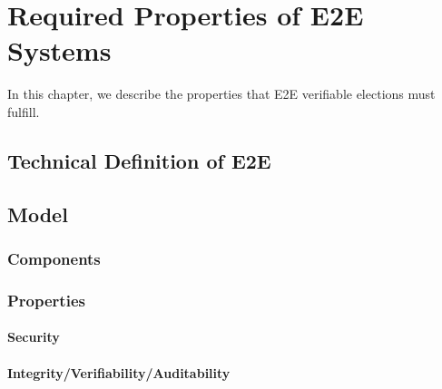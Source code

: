 \def\EA{\mathsf{EA}}
\def\VT{\mathsf{V}}
\def\RB{\mathsf{RB}}
\def\VC{\mathsf{VC}}
\def\AU{\mathsf{AU}}

\def\Exec{\mathsf{Exec}}


\def\Create{\mathtt{Create}}
\def\Sample{\mathtt{Sample}}
\def\FakeBallot{\mathtt{FakeBallot}}
\def\Deliver{\mathtt{Deliver}}
\def\Corrupt{\mathtt{Corrupt}}
\def\Verify{\mathtt{Verify}}
\def\Tally{\mathtt{Tally}}
\def\Vote{\mathtt{Vote}}
\def\RecordVote{\mathtt{RecordVote}}
\def\Append{\mathtt{Append}}
\def\Read{\mathtt{Read}}
\def\Send{\mathtt{Send}}
\def\Mail{\mathtt{Mail}}
\def\Audit{\mathtt{Audit}}
\def\VBB{\mathtt{VBB}}
\def\SendInit{\mathtt{SendInit}}
\def\GetRnd{\mathtt{GetRnd}}
\def\Select{\mathtt{Select}}
\def\RecordTally{\mathtt{RecordTally}}
\def\ReadTally{\mathtt{ReadTally}}
\def\Receipt{\mathtt{Receipt}}
\def\Result{\mathtt{Result}}
\def\ElectionFail{\mathtt{ElectionFail}}

\chapter{Required Properties of E2E Systems}

In this chapter, we describe the properties that E2E verifiable
elections must fulfill. 

\section{Technical Definition of E2E}

\section{Model}

\subsection{Components}

\subsection{Properties}

\subsubsection{Security}
\subsubsection{Integrity/Verifiability/Auditability}
